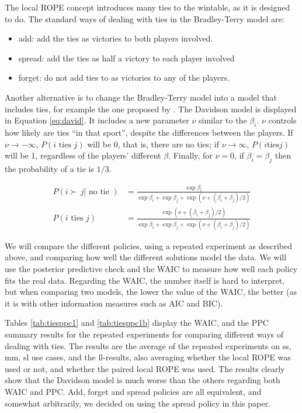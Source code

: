 \documentclass[twoside,11pt,preprint]{article}
\def\tightlist{}
\begin{document}
The local ROPE concept introduces many ties to the wintable, as it is designed to do.
The standard ways of dealing with ties in the Bradley-Terry model are:

\begin{itemize}
\tightlist
\item
  add: add the ties as victories to both players involved.
\item
  spread: add the ties as half a victory to each player involved
\item
  forget: do not add ties to as victories to any of the players.
\end{itemize}

Another alternative is to change the Bradley-Terry model into a model
that includes ties, for example the one proposed by
\citet{davidson1970extending}. The Davidson model is displayed in Equation
\ref{eq:david}. It includes a new parameter \(\nu\) similar to the
\(\beta_i\). \(\nu\) controls how likely are ties ``in that sport'', despite the differences
between the players. If \(\nu \rightarrow -\infty\), \(P( i \mbox{~ties~} j)\) will be 0, that is, there are no ties; if \(\nu \rightarrow \infty\), \(P( i \mbox{ties} j)\) will be 1, regardless of
the players' different \(\beta\). Finally, for \(\nu = 0\), if \(\beta_i = \beta_j\) then the probability of a tie is \(1/3\).

\begin{align}
 P(i \succ\,j | \mbox{~no tie~}) &= \frac{\exp \beta_i}{\exp \beta_i +\exp \beta_j + \exp(\nu + (\beta_i + \beta_j)/2) }  \label{eq:david}\\
P( i \mbox{~ties~} j) &= \frac{\exp (\nu + (\beta_i + \beta_j)/2) }{\exp \beta_i +\exp \beta_j + \exp (\nu + (\beta_i + \beta_j)/2 ) } \nonumber
\end{align}

We will compare the different policies, using a repeated experiment as
described above, and comparing how well the different solutions model
the data. We will use the posterior predictive check and the WAIC to measure
how well each policy fits the real data. Regarding the WAIC, the
number itself is hard to interpret, but when comparing two models, the
lower the value of the WAIC, the better (as it is with other
information measures such as AIC and BIC).

Tables \ref{tab:tiesppc1} and \ref{tab:tiesppc1b} display the WAIC,
and the PPC summary results for the repeated experiments for comparing
different ways of dealing with ties. The results are the average of
the repeated experiments on ss, mm, sl use cases, and the ll-results,
also averaging whether the local ROPE was used or not, and whether the
paired local ROPE was used. The results clearly show that the Davidson
model is much worse than the others regarding both WAIC and
PPC. Add, forget and spread policies are all equivalent, and somewhat
arbitrarily, we decided on using the spread policy in this paper.
\end{document}
